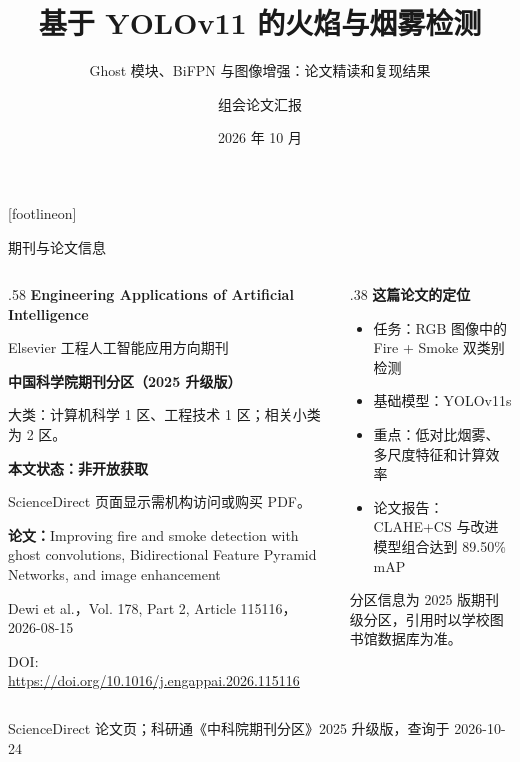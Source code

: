 \documentclass[aspectratio=169,10pt]{ctexbeamer}
\title[YOLO-GN+BIFPN]{基于 YOLOv11 的火焰与烟雾检测}
\subtitle{Ghost 模块、BiFPN 与图像增强：论文精读和复现结果}
\author[组会汇报]{组会论文汇报}
\institute[USTC Beamer]{\emph{Engineering Applications of Artificial Intelligence}, 2026}
\date{2026 年 10 月}
\newcommand{\paperref}[1]{\par\vfill{\raggedleft\scriptsize\textcolor{neutral}{#1}\par}}
\begin{document}
\maketitleframe
{}[footlineon]

\begin{frame}{期刊与论文信息}
  \begin{columns}[T,onlytextwidth]
    \begin{column}{.58\textwidth}
      {\Large\bfseries Engineering Applications of Artificial Intelligence}\par\medskip
      Elsevier 工程人工智能应用方向期刊\par\smallskip
      \textbf{中国科学院期刊分区（2025 升级版）}\par
      大类：计算机科学 1 区、工程技术 1 区；相关小类为 2 区。\par\medskip
      \textbf{本文状态：非开放获取}\par
      ScienceDirect 页面显示需机构访问或购买 PDF。\par\medskip
      \textbf{论文：}Improving fire and smoke detection with ghost convolutions, Bidirectional Feature Pyramid Networks, and image enhancement\par
      \small Dewi et al.，Vol. 178, Part 2, Article 115116，2026-08-15\par
      \small DOI: \url{https://doi.org/10.1016/j.engappai.2026.115116}
    \end{column}
    \begin{column}{.38\textwidth}
      \vspace{.2cm}
      {\Large\bfseries 这篇论文的定位}\par\medskip
      \begin{itemize}
        \item 任务：RGB 图像中的 Fire + Smoke 双类别检测
        \item 基础模型：YOLOv11s
        \item 重点：低对比烟雾、多尺度特征和计算效率
        \item 论文报告：CLAHE+CS 与改进模型组合达到 89.50\% mAP
      \end{itemize}
      \vspace{.15cm}
      {\footnotesize 分区信息为 2025 版期刊级分区，引用时以学校图书馆数据库为准。}
    \end{column}
  \end{columns}
  \paperref{ScienceDirect 论文页；科研通《中科院期刊分区》2025 升级版，查询于 2026-10-24}
\end{frame}
\end{document}
